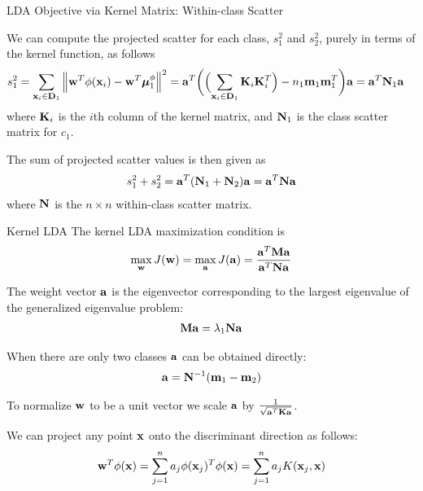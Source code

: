 \begin{frame}{LDA Objective via Kernel Matrix: Within-class Scatter}

We can compute the projected scatter for each class, $s_1^2$
and $s_2^2$, purely in terms of the kernel function, as follows
\begin{align*}
    s_1^2 & = \sum_{\mathbf{x}_i \in \mathbf{D}_1}
    \left\lVert\mathbf{w}^T\phi(\mathbf{x}_i) - \mathbf{w}^T{\bm \mu}^\phi_1\right\rVert^2
    = \mathbf{a}^T \biggl(
    \Bigl(\sum_{\mathbf{x}_i \in \mathbf{D}_1} \mathbf{K}_i\mathbf{K}_i^T\Bigr)
    - n_1 \mathbf{m}_1 \mathbf{m}_1^T \biggr) \mathbf{a}
     = \mathbf{a}^T \mathbf{N}_1 \mathbf{a}
\end{align*}
where $\mathbf{K}_i$ is the $i$th column of the kernel matrix, and $\mathbf{N}_1$
is the class scatter matrix for $c_1$. 

\medskip
The sum of projected scatter values is then given as
\begin{align*}
  s_1^2 + s_2^2 = \mathbf{a}^T (\mathbf{N}_1 + \mathbf{N}_2) \mathbf{a} = \mathbf{a}^T \mathbf{N} \mathbf{a}
\end{align*}
where $\mathbf{N}$ is the $n\times n$ within-class scatter matrix.
\end{frame}

\begin{frame}{Kernel LDA}
The kernel LDA maximization condition is
\begin{align*}
    \max_{\mathbf{w}} J(\mathbf{w}) = \max_{\mathbf{a}} J(\mathbf{a}) =
    {\mathbf{a}^T\mathbf{M}\mathbf{a} \over \mathbf{a}^T\mathbf{N}\mathbf{a}}
\end{align*}


\medskip
The weight vector $\mathbf{a}$ is the eigenvector
corresponding to the largest eigenvalue of the generalized
eigenvalue problem:
\begin{align*}
    \mathbf{M}\mathbf{a} = \lambda_1\mathbf{N}\mathbf{a}
\end{align*}

\medskip
When there are only two classes $\mathbf{a}$ can be
obtained directly:
\begin{align*}
    \mathbf{a} = \mathbf{N}^{-1} (\mathbf{m}_1 - \mathbf{m}_2)
\end{align*}

\medskip
To normalize $\mathbf{w}$ to be a unit vector  we
scale $\mathbf{a}$ by $1 \over \sqrt{\mathbf{a}^T\mathbf{K}\mathbf{a}}$.


\medskip
We can project any point $\mathbf{x}$ onto the discriminant
direction as follows:
\begin{align*}
  \mathbf{w}^T\phi(\mathbf{x}) = \displaystyle \sum_{j=1}^n a_{j}\phi(\mathbf{x}_{j})^T\phi(\mathbf{x}) =
  \displaystyle \sum_{j=1}^n a_{j} K(\mathbf{x}_{j},\mathbf{x})
\end{align*}
\end{frame}




